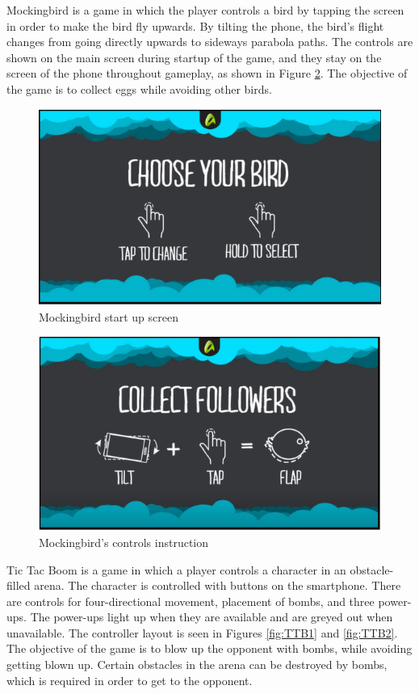 Mockingbird is a game in which the player controls a bird by tapping the screen in order to make the bird fly upwards. By tilting the phone, the bird’s flight changes from going directly upwards to sideways parabola paths. The controls are shown on the main screen during startup of the game, and they stay on the screen of the phone throughout gameplay, as shown in Figure \ref{fig:MBird2}. The objective of the game is to collect eggs while avoiding other birds.

\begin{figure}
\centering
\includegraphics[width=\textwidth]{figures/birdSelect}
\caption{Mockingbird start up screen}\label{fig:MBird1}
\end{figure}

\begin{figure}
\centering
\includegraphics[width=\textwidth]{figures/birdPlay} 
\caption{Mockingbird's controls instruction}\label{fig:MBird2}
\end{figure}

Tic Tac Boom is a game in which a player controls a character in an obstacle-filled arena. The character is controlled with buttons on the smartphone. There are controls for four-directional movement, placement of bombs, and three power-ups. The power-ups light up when they are available and are greyed out when unavailable. The controller layout is seen in Figures \ref{fig:TTB1} and \ref{fig:TTB2}. The objective of the game is to blow up the opponent with bombs, while avoiding getting blown up. Certain obstacles in the arena can be destroyed by bombs, which is required in order to get to the opponent.

